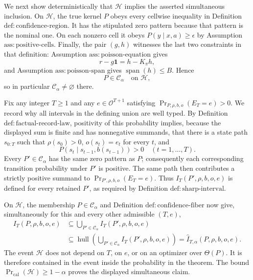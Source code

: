 We next show deterministically that \(\mathcal H\) implies the asserted simultaneous inclusion.  On \(\mathcal H\), the true kernel \(P\) obeys every cellwise inequality in Definition \(\mathrm{def:confidence\mbox{-}region}\).  It has the stipulated zero pattern because that pattern is the nominal one.  On each nonzero cell it obeys \(P(y\mid x,a)\ge\epsilon\) by Assumption \(\mathrm{ass:positive\mbox{-}cells}\).  Finally, the pair \((g,h)\) witnesses the last two constraints in that definition: Assumption \(\mathrm{ass:poisson\mbox{-}equation}\) gives
\[
 r-g\mathbf 1=h-K_{\pi}h,
\]
and Assumption \(\mathrm{ass:poisson\mbox{-}span}\) gives \(\operatorname{span}(h)\le B\).  Hence
\[
 P\in\mathcal C_{\alpha}
 \quad\text{on }\mathcal H,
\]
so in particular \(\mathcal C_{\alpha}\ne\varnothing\) there.

Fix any integer \(T\ge1\) and any \(e\in\mathcal O^{T+1}\) satisfying \(\Pr_{P,\rho,b,o}(E_T=e)>0\).  We record why all intervals in the defining union are well typed.  By Definition \(\mathrm{def:factual\mbox{-}record\mbox{-}law}\), positivity of this probability implies, because the displayed sum is finite and has nonnegative summands, that there is a state path \(s_{0:T}\) such that \(\rho(s_0)>0\), \(o(s_t)=e_t\) for every \(t\), and
\[
 P(s_t\mid s_{t-1},b(s_{t-1}))>0
 \quad (t=1,\ldots,T).
\]
Every \(P'\in\mathcal C_{\alpha}\) has the same zero pattern as \(P\); consequently each corresponding transition probability under \(P'\) is positive.  The same path then contributes a strictly positive summand to \(\Pr_{P',\rho,b,o}(E_T=e)\).  Thus \(I_T(P',\rho,b,o,e)\) is defined for every retained \(P'\), as required by Definition \(\mathrm{def:sharp\mbox{-}interval}\).

On \(\mathcal H\), the membership \(P\in\mathcal C_{\alpha}\) and Definition \(\mathrm{def:confidence\mbox{-}fiber}\) now give, simultaneously for this and every other admissible \((T,e)\),
\[
 \begin{aligned}
 I_T(P,\rho,b,o,e)
 &\subseteq
 \bigcup_{P'\in\mathcal C_{\alpha}}I_T(P',\rho,b,o,e)\\
 &\subseteq
 \operatorname{hull}\!\left(
   \bigcup_{P'\in\mathcal C_{\alpha}}I_T(P',\rho,b,o,e)
 \right)
 =\widehat I_{T,\alpha}(P,\rho,b,o,e).
 \end{aligned}
\]
The event \(\mathcal H\) does not depend on \(T\), on \(e\), or on an optimizer over \(\Theta(P)\).  It is therefore contained in the event inside the probability in the theorem.  The bound \(\Pr_{\mathrm{cal}}(\mathcal H)\ge1-\alpha\) proves the displayed simultaneous claim.

